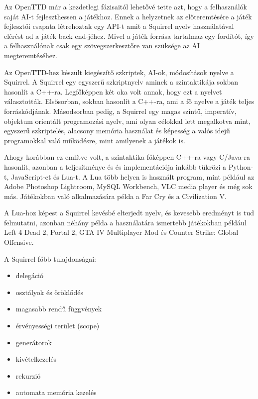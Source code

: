 
Az OpenTTD már a kezdetlegi fázisaitól lehetővé tette azt, hogy a felhasználók saját AI-t fejleszthessen a játékhoz. Ennek a helyzetnek az előteremtésére a játék fejlesztői csapata létrehoztak egy API-t amit a Squirrel nyelv használatával elérést ad a játék back end-jéhez. Mivel a játék forrása tartalmaz egy fordítót, így a felhasználónak csak egy szövegszerkesztőre van szüksége az AI megteremtéséhez.




Az OpenTTD-hez készült kiegészítő szkriptek, AI-ok, módosítások nyelve a Squirrel. A Squirrel egy egyszerű szkriptnyelv aminek a szintaktikája sokban hasonlít a C++-ra. Legfőképpen két oka volt annak, hogy ezt a nyelvet választották. Elsősorban, sokban hasonlít a C++-ra, ami a fő nyelve a játék teljes forráskódjának. Másodsorban pedig, a Squirrel egy magas szintű,  imperatív, objektum orientált programozási nyelv, ami olyan célokkal lett megalkotva mint, egyszerű szkriptelés, alacsony memória használat és képesség a valós idejű programokkal való működésre, mint amilyenek a játékok is.

Ahogy korábban ez említve volt, a szintaktika főképpen C++-ra vagy C/Java-ra hasonlít, azonban a teljesítménye és és implementációja inkább tükrözi a Python-t, JavaScript-et és Lua-t. A Lua több helyen is használt program, mint például az Adobe Photoshop Lightroom, MySQL Workbench, VLC media player és még sok más. Játékokban való alkalmazására példa a Far Cry és a Civilization V.

A Lua-hoz képest a Squirrel kevésbé elterjedt nyelv, és kevesebb eredményt is tud felmutatni, azonban néhány példa a használatára ismertebb játékokban például Left 4 Dead 2, Portal 2, GTA IV Multiplayer Mod és Counter Strike: Global Offensive.

A Squirrel főbb tulajdonságai:

\begin{itemize}
	\item delegáció
	\item osztályok és öröklődés
	\item magasabb rendű függvények
	\item érvényességi terület (scope)
	\item generátorok
	\item kivételkezelés
	\item rekurzió
	\item automata memória kezelés
\end{itemize}

